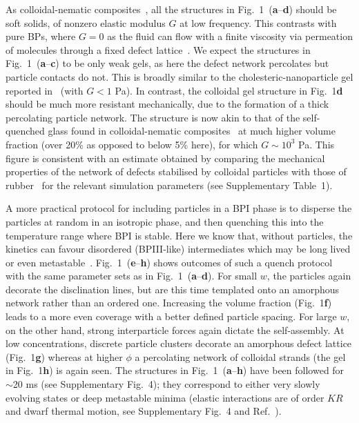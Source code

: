\documentclass[12pt]{article}
\begin{document}
As colloidal-nematic composites~\cite{tiffany}, all the structures in
Fig.~1~(\textbf{a}--\textbf{d}) 
should be soft solids, of nonzero elastic 
modulus $G$ at low frequency. This contrasts with pure BPs, where
$G=0$ as the fluid can flow with a finite
viscosity via permeation of molecules through a fixed defect lattice~\cite{permeation1,permeation2}. We expect the
structures in Fig.~1~(\textbf{a}--\textbf{c}) to be only weak gels,
as here the 
defect network percolates but particle contacts do not. This is broadly similar to the cholesteric-nanoparticle gel reported
in~\cite{lubensky} (with $G<1$ Pa). In contrast, the colloidal gel
structure in Fig.~1\textbf{d} should be much more resistant mechanically, 
due to the formation of a thick percolating particle network. The 
structure is now akin to that of the self-quenched glass found in 
colloidal-nematic composites~\cite{tiffany} at much higher volume 
fraction (over 20\% as opposed to below 5\% here), for which $G\sim 10^3$ Pa.
This figure is consistent with an estimate obtained by comparing
the mechanical properties of the network of defects stabilised by
colloidal particles with those of rubber~\cite{ramos} for
the relevant simulation parameters (see Supplementary Table~1).


A more practical protocol for including particles in a BPI phase is to
disperse the particles at random in an isotropic phase, and then
quenching this into the temperature range where BPI is stable.
Here we know that, without particles, the kinetics can favour
disordered (BPIII-like) intermediates which may be long lived
or even metastable~\cite{domaingrowth}. Fig.~1~(\textbf{e}--\textbf{h})
shows outcomes of such a quench protocol with the same parameter sets as
in Fig.~1~(\textbf{a}--\textbf{d}). For small $w$, the particles again
decorate the disclination lines, but are this time templated onto an
amorphous network rather than an ordered one.
Increasing the volume fraction (Fig.~1\textbf{f}) leads to a more even
coverage with a better defined particle spacing. 
For large $w$, on the other hand, strong interparticle forces again dictate
the self-assembly. At low concentrations, discrete particle clusters
decorate an amorphous defect lattice (Fig.~1\textbf{g}) whereas at
higher $\phi$ a percolating network of colloidal strands
(the gel in Fig.~1\textbf{h}) is again seen. 
The structures in Fig.~1~(\textbf{a}--\textbf{h}) have been followed for
$\sim$20 ms 
(see Supplementary Fig.~4); they correspond to either very slowly evolving
states or  deep metastable minima (elastic interactions are of
order $KR$ and dwarf thermal motion, see
Supplementary Fig.~4 and Ref.~\cite{stark,lavrentovich}).
\end{document}
